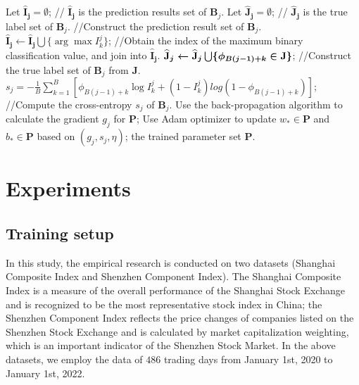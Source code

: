 \documentclass[sn-mathphys]{sn-jnl}%
\theoremstyle{thmstyleone}%
\theoremstyle{thmstyletwo}%
\theoremstyle{thmstylethree}%
\begin{document}
\begin{algorithm}[htbp]
\begin{algorithmic}[1]
    \State Let $\boldsymbol{\widehat{\mathbf{I}}_j} =\emptyset$; // $\boldsymbol{\widehat{\mathbf{I}}_j}$ is the prediction results set of $\mathbf{B}_j$.
    \State Let $\boldsymbol{\widehat{\mathbf{J}}_j}=\emptyset$;  //  $\boldsymbol{\widehat{J}_j}$ is the true label set of $\mathbf{B}_j$.
        //Construct the prediction result set of $\mathbf{B}_j$.
        \State $\boldsymbol{\widehat{\mathbf{I}}_j}\gets\boldsymbol{\widehat{\mathbf{I}}_j}\bigcup\{\arg\max{I_k^j}\}$;  //Obtain the index of the maximum binary classification value, and join into $\boldsymbol{\widehat{\mathbf{I}}_j}$.
        \State $\boldmath{\widehat{\mathbf{J}}_j} \gets\boldsymbol{\widehat{\mathbf{J}}_j}\bigcup\{\phi_{B(j-1)+k}\in\boldsymbol{\mathbf{J}}\}$;  //Construct the true label set of $\mathbf{B}_j$ from $\boldsymbol{\mathbf{J}}$.
    \EndFor
    \State $s_j = -\frac{1}{B}\sum_{k=1}^{B} \left[\phi_{B(j-1)+k}\log I_k^j + (1- I_k^j) log(1-\phi_{B(j-1)+k})\right]$; //Compute the cross-entropy $s_j$ of $\mathbf{B}_j$.
    \State Use the back-propagation algorithm\cite{RN216} to calculate the gradient $g_j$ for $\boldsymbol{\mathbf{P}}$;
    \State Use Adam optimizer\cite{RN191} to update $w_*\in\boldsymbol{\mathbf{P}}$ and $b_*\in\boldsymbol{\mathbf{P}}$ based on $(g_j,s_j,\eta)$;
\EndFor
{} the trained parameter set $\mathbf{P}$.
\nolinenumbers
\end{algorithmic}
\end{algorithm}

\section{Experiments}\label{4Experiment}
\subsection{Training setup}\label{Training setup}
In this study, the empirical research is conducted on two datasets (Shanghai Composite Index and Shenzhen Component Index). The Shanghai Composite Index is a measure of the overall performance of the Shanghai Stock Exchange and is recognized to be the most representative stock index in China; the Shenzhen Component Index reflects the price changes of companies listed on the Shenzhen Stock Exchange and is calculated by market capitalization weighting, which is an important indicator of the Shenzhen Stock Market. In the above datasets, we employ the data of $486$ trading days from January 1st, 2020 to January 1st, 2022.
\end{document}
